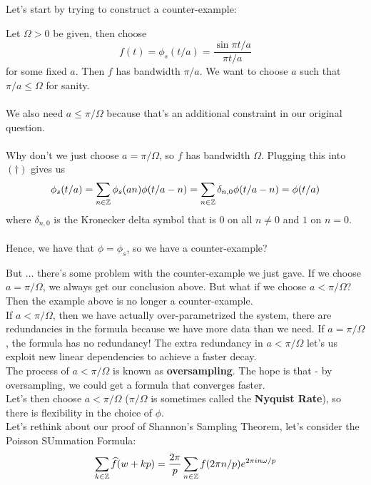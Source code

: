 \documentclass{article}
\begin{document}
Let's start by trying to construct a counter-example:

\begin{example}
    Let $\Omega > 0$ be given, then choose
    \[f(t) = \phi_s(t/a) = \frac{\sin \pi t/a}{\pi t/a}\]
    for some fixed $a$. Then $f$ has bandwidth $\pi/a$. We want to choose $a$ such that $\pi/a \leq \Omega$ for sanity.\\\\
    We also need $a \leq \pi/\Omega$ because that's an additional constraint in our original question.\\\\
    Why don't we just choose $a = \pi/\Omega$, so $f$ has bandwidth $\Omega$. Plugging this into $(\dagger)$ gives us
    \[\phi_s(t/a) = \sum_{n \in \mathbb{Z}} \phi_s(an) \phi(t/a - n) = \sum_{n \in \mathbb{Z}} \delta_{n, 0} \phi(t/a - n) = \phi(t/a) \]
    where $\delta_{n, 0}$ is the Kronecker delta symbol that is $0$ on all $n \neq 0$ and $1$ on $n = 0$.\\\\
    Hence, we have that $\phi = \phi_s$, so we have a counter-example?
\end{example}

But ... there's some problem with the counter-example we just gave. If we choose $a = \pi/\Omega$, we always get our conclusion above. But what if we choose $a < \pi/\Omega$? Then the example above is no longer a counter-example.\\

If $a < \pi/\Omega$, then we have actually over-parametrized the system, there are redundancies in the formula because we have more data than we need. If $a = \pi/\Omega$, the formula has no redundancy! The extra redundancy in $a < \pi/\Omega$ let's us exploit new linear dependencies to achieve a faster decay.\\

The process of $a < \pi/\Omega$ is known as \textbf{oversampling}. The hope is that - by oversampling, we could get a formula that converges faster.\\

Let's then choose $a < \pi/\Omega$ ($\pi/\Omega$ is sometimes called the \textbf{Nyquist Rate}), so there is flexibility in the choice of $\phi$.\\

Let's rethink about our proof of Shannon's Sampling Theorem, let's consider the Poisson SUmmation Formula:
\[\sum_{k \in \mathbb{Z}} \widehat{f}(w + kp) = \frac{2\pi}{p} \sum_{n \in \mathbb{Z}} f(2\pi n/p) e^{2\pi i n \omega/p}\]
\end{document}
